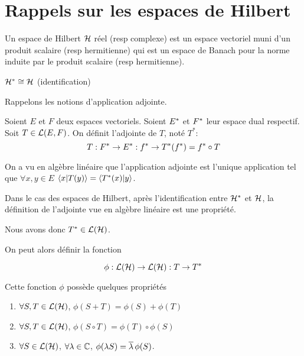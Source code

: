 \section{Rappels sur les espaces de Hilbert}

\begin{definition}
	Un espace de Hilbert $\mathcal{H}$ réel (resp complexe) est un espace vectoriel
	muni d'un produit scalaire (resp hermitienne) qui est un espace de Banach
	pour la norme induite par le produit scalaire (resp hermitienne).
\end{definition}

\begin{theorem}
	$\mathcal{H}^{*} \cong \mathcal{H}$ (identification)
	\label{thm:repr_riesz}
\end{theorem}

Rappelons les notions d'application adjointe.

\begin{definition}
	Soient $E$ et $F$ deux espaces vectoriels. Soient $E^{*}$ et
	$F^{*}$ leur espace dual respectif.
	Soit $T \in \mathcal{L}(E, F)$. On définit l'adjointe de $T$, noté
	$T^{*}$:
	\begin{equation}
		T : F^{*} \rightarrow E^{*} : f^{*} \rightarrow T^{*}(f^{*})
	= f^{*} \circ T
		\label{def:adjointe_operator}
	\end{equation}
\end{definition}

On a vu en algèbre linéaire que l'application adjointe est l'unique application
tel que $\forall x, y \in E$ $\bra{x}\ket{T(y)} = \bra{T^{*}(x)}\ket{y}$.

Dans le cas des espaces de Hilbert, après l'identification entre
$\mathcal{H}^{*}$ et $\mathcal{H}$, la définition de l'adjointe vue en algèbre
linéaire est une propriété.

Nous avons donc $T^{*} \in \mathcal{L}(\mathcal{H})$.

On peut alors définir la fonction 

\begin{equation}
	\phi : \mathcal{L}(\mathcal{H}) \rightarrow \mathcal{L}(\mathcal{H}) : T \rightarrow
	T^{*}
\end{equation}

Cette fonction $\phi$ possède quelques propriétés

\begin{enumerate}
	\item $\forall S, T \in \mathcal{L}(\mathcal{H})$, $\phi(S + T) =
		\phi(S) + \phi(T)$
	\item $\forall S, T \in \mathcal{L}(\mathcal{H})$, $\phi(S \circ T) = \phi(T)
		\circ \phi(S)$
	\item $\forall S \in \mathcal{L}(\mathcal{H})$, $\forall \lambda \in
		\mathbb{C}$, $\phi(\lambda S) = \overline{\lambda} \, \phi(S)$.
\end{enumerate}

